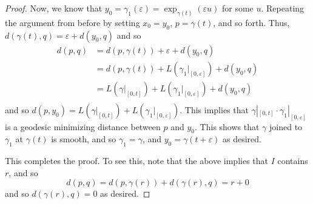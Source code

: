 \documentclass[../main.tex]{subfiles}
\begin{document}
\begin{proof}
    Now, we know that $y_0 = \gamma_1(\varepsilon) =
    \exp_{\gamma(t)}(\varepsilon u)$ for some $u$. Repeating the argument from
    before by setting $x_0=y_0$, $p=\gamma(t)$, and so forth. Thus,
    $d(\gamma(t),q) = \varepsilon + d(y_0,q)$ and so
    \[
        \begin{aligned}
        d(p,q) &= d(p,\gamma(t)) + \varepsilon + d(y_0,q)\\
        &= d(p,\gamma(t)) + L(\gamma_1|_{[0,\varepsilon]}) + d(y_0,q)\\
        &= L(\gamma|_{[0,t]}) +L(\gamma_1|_{[0,\varepsilon]}) + d(y_0,q)\\ 
    \end{aligned}
    \]
    and so $d(p,y_0) = L(\gamma|_{[0,t]}) +L(\gamma_1|_{[0,\varepsilon]})$. This
    implies that $\gamma|_{[0,t]}\cdot \gamma_1|_{[0,\varepsilon]}$ is a
    geodesic minimizing distance between $p$ and $y_0$. This shows that $\gamma$
    joined to $\gamma_1$ at $\gamma(t)$ is smooth, and so $\gamma_1=\gamma$, and
    $y_0 = \gamma(t+\varepsilon)$ as desired.

    This completes the proof. To see this, note that the above implies that $I$
    contains $r$, and so
    \[
        d(p,q) = d(p,\gamma(r)) +d(\gamma(r),q) = r+0
    \]
    and so $d(\gamma(r),q) = 0$ as desired.
\end{proof}
\end{document}
